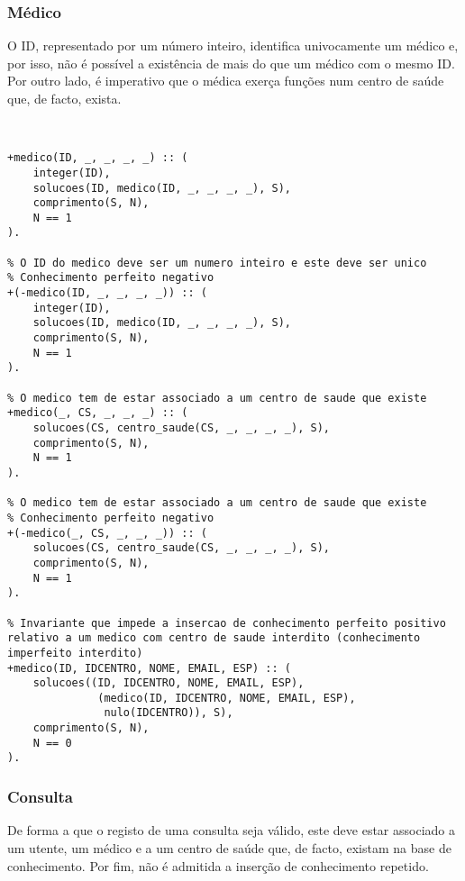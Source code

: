 \pagebreak

\subsubsection*{Médico}
O ID, representado por um número inteiro, identifica univocamente um médico e, por isso, não é possível a existência de
mais do que um médico com o mesmo ID. Por outro lado, é imperativo que o médica exerça funções num centro de saúde que,
de facto, exista.

\

\begin{lstlisting}[caption={Invariantes de inserção relativos ao predicado \texttt{medico}}]
% O ID do medico deve ser um numero inteiro e este deve ser unico
+medico(ID, _, _, _, _) :: (
    integer(ID),
    solucoes(ID, medico(ID, _, _, _, _), S),
    comprimento(S, N),
    N == 1
).

% O ID do medico deve ser um numero inteiro e este deve ser unico
% Conhecimento perfeito negativo
+(-medico(ID, _, _, _, _)) :: (
    integer(ID),
    solucoes(ID, medico(ID, _, _, _, _), S),
    comprimento(S, N),
    N == 1
).

% O medico tem de estar associado a um centro de saude que existe
+medico(_, CS, _, _, _) :: (
    solucoes(CS, centro_saude(CS, _, _, _, _), S),
    comprimento(S, N),
    N == 1
).

% O medico tem de estar associado a um centro de saude que existe
% Conhecimento perfeito negativo
+(-medico(_, CS, _, _, _)) :: (
    solucoes(CS, centro_saude(CS, _, _, _, _), S),
    comprimento(S, N),
    N == 1
).

% Invariante que impede a insercao de conhecimento perfeito positivo relativo a um medico com centro de saude interdito (conhecimento imperfeito interdito)
+medico(ID, IDCENTRO, NOME, EMAIL, ESP) :: (
    solucoes((ID, IDCENTRO, NOME, EMAIL, ESP),
              (medico(ID, IDCENTRO, NOME, EMAIL, ESP),
               nulo(IDCENTRO)), S),
    comprimento(S, N),
    N == 0
).

\end{lstlisting}

\subsubsection*{Consulta}
De forma a que o registo de uma consulta seja válido, este deve estar associado a um utente, um médico e a um centro de
saúde que, de facto, existam na base de conhecimento. Por fim, não é admitida a inserção de conhecimento repetido.

